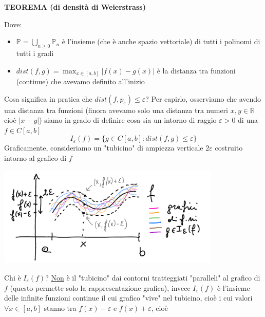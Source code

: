 \documentclass[12pt]{article}
\begin{document}
\newline \newline
\textbf{TEOREMA (di densità di Weierstrass)}
\begin{center}
\end{center}
Dove:
\begin{itemize}
    \item $\mathbb{P} = \bigcup_{n \ge 0} \mathbb{P}_n$ è l'insieme (che è anche spazio vettoriale) di tutti i polinomi di tutti i gradi
    \item $dist(f,g) = \max_{x\in [a,b]} |f(x)-g(x)|$ è la distanza tra funzioni (continue) che avevamo definito all'inizio
\end{itemize}
Cosa significa in pratica che $dist(f,p_{\varepsilon}) \le \varepsilon$? Per capirlo, osserviamo che avendo una distanza tra funzioni (finora avevamo solo una distanza tra numeri $x,y \in \mathbb{R}$ cioè $|x-y|$) siamo in grado di definire cosa sia un intorno
di raggio $\varepsilon >0$ di una $f\in C[a,b]$
\[I_{\varepsilon}(f) = \{g \in C[a,b] : dist(f,g) \le \varepsilon\}\]
Graficamente, consideriamo un "tubicino" di ampiezza verticale $2\varepsilon$ costruito intorno al grafico di $f$
\begin{center}
    \includegraphics[width=0.8\textwidth]{pag32}
\end{center}
Chi è $I_{\varepsilon}(f)$? \underline{Non} è il "tubicino" dai contorni tratteggiati "paralleli" al grafico di $f$ (questo permette solo
la rappresentazione grafica), invece $I_{\varepsilon}(f)$ è l'insieme delle infinite funzioni continue il cui grafico "vive" nel tubicino, cioè i cui valori $\forall x \in [a,b]$ stanno tra $f(x)-\varepsilon$ e $f(x)+\varepsilon$, cioè 
\end{document}
